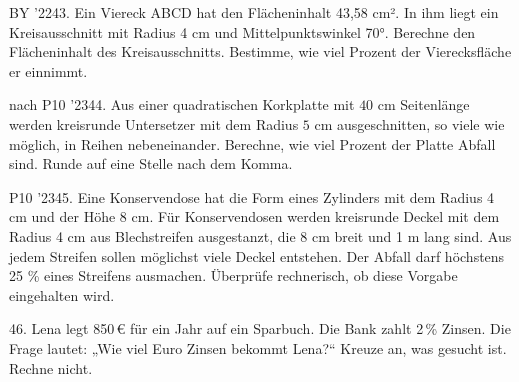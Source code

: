 \documentclass[11pt]{article}
\begin{document}
\pfgruppe{}
\begin{pfaufg}{BY ’22}{43.}{}
Ein Viereck ABCD hat den Flächeninhalt 43,58 cm². In ihm liegt ein Kreisausschnitt mit Radius 4 cm und Mittelpunktswinkel 70°. Berechne den Flächeninhalt des Kreisausschnitts. Bestimme, wie viel Prozent der Vierecksfläche er einnimmt.
\par\smallskip\noindent {}\par
{}
\end{pfaufg}
\begin{pfaufg}{nach P10 ’23}{\llap{\textasteriskcentered\,}44.}{}
Aus einer quadratischen Korkplatte mit $40$ cm Seitenlänge werden kreisrunde Untersetzer mit dem Radius $5$ cm ausgeschnitten, so viele wie möglich, in Reihen nebeneinander. Berechne, wie viel Prozent der Platte Abfall sind. Runde auf eine Stelle nach dem Komma.
\end{pfaufg}
\pfgruppe{}
\begin{pfaufg}{P10 ’23}{\llap{\textasteriskcentered\,}45.}{}
Eine Konservendose hat die Form eines Zylinders mit dem Radius 4 cm und der Höhe 8 cm. Für Konservendosen werden kreisrunde Deckel mit dem Radius 4 cm aus Blechstreifen ausgestanzt, die 8 cm breit und 1 m lang sind. Aus jedem Streifen sollen möglichst viele Deckel entstehen. Der Abfall darf höchstens 25 \% eines Streifens ausmachen. Überprüfe rechnerisch, ob diese Vorgabe eingehalten wird.
\end{pfaufg}
\pfgruppe{}
\begin{pfaufg}{}{46.}{}
Lena legt 850\,€ für ein Jahr auf ein Sparbuch. Die Bank zahlt 2\,\% Zinsen. Die Frage lautet: „Wie viel Euro Zinsen bekommt Lena?“ Kreuze an, was gesucht ist. Rechne nicht. 
\end{pfaufg}
\end{document}
